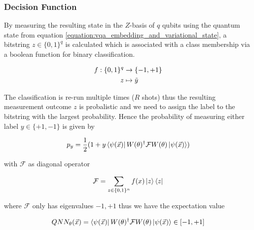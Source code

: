 \clearpage

\subsubsection{Decision Function}
By measuring the resulting state in the $Z$-basis of $q$ qubits using the quantum state from equation \ref{equation:vqa_embedding_and_variational_state}, a bitstring $z \in \{0,1\}^q$ is calculated which is associated with a class membership via a boolean function for binary classification.

\begin{equation} 
    \centering
    \begin{split}
        f:\{0,1\}^q & \rightarrow \{-1,+1\}\\
        z & \mapsto \tilde{y}
    \end{split}
    \label{equation:vqa_boolean_membership_function}
\end{equation}

The classification is re-run multiple times ($R$ shots) thus the resulting measurement outcome $z$ is probalistic and we need to assign the label to the bitstring with the largest probability. Hence the probability of measuring either label $y \in \{+1, −1\}$ is given by

\begin{equation} 
    \centering
    \begin{split}
        p_y = \frac{1}{2} ( 1 + y \bra{\psi{(\vec{x})}} W(\theta)^\dag \mathcal{F} W(\theta) \ket{\psi{(\vec{x})}} )
    \end{split}
    \label{equation:vqa_probability_py}
\end{equation}

with $\mathcal{F}$ as diagonal operator

\begin{equation} 
    \centering
    \begin{split}
        \mathcal{F} = \sum_{z \in \{0,1\}^n}f(x)\ket{z}\bra{z}
    \end{split}
    \label{equation:vqa_diagonal_operator}
\end{equation}

where $\mathcal{F}$ only has eigenvalues $-1, +1$ thus we have the expectation value

\begin{equation} 
    \centering
    \begin{split}
        QNN_{\theta}(\vec{x}) = \bra{\psi{(\vec{x})}} W(\theta)^\dag \mathcal{F} W(\theta) \ket{\psi{(\vec{x})}} \in [-1,+1]
    \end{split}
    \label{equation:vqa_expectation_value}
\end{equation}

